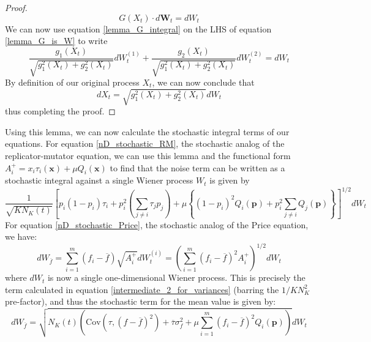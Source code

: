 \begin{proof}
\begin{equation}
	\label{lemma_G_is_W}
	G(X_t) \cdot d\mathbf{W}_t = dW_t
\end{equation}
We can now use equation \eqref{lemma_G_integral} on the LHS of equation \eqref{lemma_G_is_W} to write
\begin{equation}
	\frac{g_1(X_t)}{\sqrt{g_1^2(X_t) + g_2^2(X_t)}} dW^{(1)}_t + \frac{g_2(X_t)}{\sqrt{g_1^2(X_t) + g_2^2(X_t)}}dW^{(2)}_t = dW_t
\end{equation}
By definition of our original process $X_t$, we can now conclude that
\begin{equation}
	dX_t = \sqrt{g_1^2(X_t) + g_2^2(X_t)}dW_t
\end{equation}
thus completing the proof.
\end{proof}

Using this lemma, we can now calculate the stochastic integral terms of our equations. For equation \eqref{nD_stochastic_RM}, the stochastic analog of the replicator-mutator equation, we can use this lemma and the functional form $A_i^+ = x_i\tau_i(\mathbf{x}) + \mu Q_i(\mathbf{x})$ to find that the noise term can be written as a stochastic integral against a single Wiener process $W_t$ is given by
\begin{equation}
\label{nD_stoch_RM_noise_term_alt_representation}
\frac{1}{\sqrt{KN_{K}(t)}}\left[p_i(1-p_i)\tau_i + p_i^2\left(\sum\limits_{j\neq i}\tau_j p_j\right) + \mu\left\{(1-p_i)^2Q_i(\mathbf{p}) + p_i^2 \sum\limits_{j\neq i}Q_j(\mathbf{p})\right\}\right]^{1/2}dW_t
\end{equation}
For equation \eqref{nD_stochastic_Price}, the stochastic analog of the Price equation, we have:
\begin{equation}
dW_{\overline{f}} = \sum\limits_{i=1}^{m}\left(f_i-\overline{f}\right)\sqrt{A_i^+}dW_{t}^{(i)} = \left(\sum\limits_{i=1}^{m}\left(f_i-\overline{f}\right)^2A_i^+\right)^{1/2}dW_t
\end{equation}
where $dW_t$ is now a single one-dimensional Wiener process. This is precisely the term calculated in equation \eqref{intermediate_2_for_variances} (barring the $1/KN_K^2$ pre-factor), and thus the stochastic term for the mean value is given by:
\begin{equation}
	\label{nD_stoch_Price_noise_term_alt_representation}
	dW_{\overline{f}} = \sqrt{N_K(t) \left(\textrm{Cov}(\tau,\left(f - \overline{f}\right)^2) + \overline{\tau}\sigma^2_{f} +\mu \sum\limits_{i=1}^{m}\left(f_i - \overline{f}\right)^2Q_i(\mathbf{p})\right)}dW_t
\end{equation}

